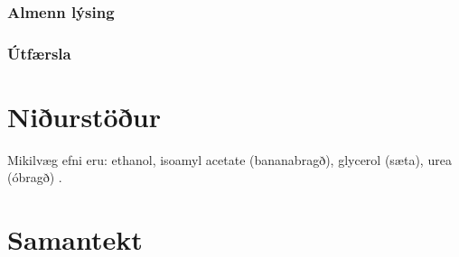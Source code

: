\documentclass[12pt]{article}
\begin{document}
\subsubsection{Almenn lýsing}
\subsubsection{Útfærsla}

\section{Niðurstöður}

Mikilvæg efni eru: ethanol, isoamyl acetate (bananabragð), glycerol (sæta), urea (óbragð) \cite{dequin2001potential}.


\section{Samantekt}


\appendix


\end{document}
